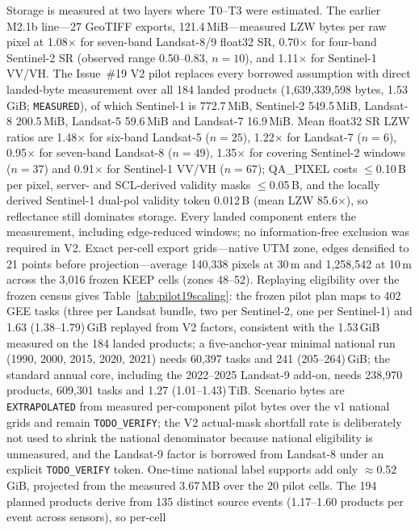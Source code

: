 Storage is measured at two layers where T0--T3 were estimated. The
earlier M2.1b line---27 GeoTIFF exports, 121.4\,MiB---measured LZW
bytes per raw pixel at 1.08$\times$ for seven-band Landsat-8/9 float32
SR, 0.70$\times$ for four-band Sentinel-2 SR (observed range
0.50--0.83, $n=10$), and 1.11$\times$ for Sentinel-1 VV/VH. The
Issue~\#19 V2 pilot replaces every borrowed assumption with direct
landed-byte measurement over all 184 landed products
(1{,}639{,}339{,}598 bytes, 1.53\,GiB; \texttt{MEASURED}), of which
Sentinel-1 is 772.7\,MiB, Sentinel-2 549.5\,MiB, Landsat-8 200.5\,MiB,
Landsat-5 59.6\,MiB and Landsat-7 16.9\,MiB. Mean float32 SR LZW
ratios are 1.48$\times$ for six-band Landsat-5 ($n=25$),
1.22$\times$ for Landsat-7 ($n=6$), 0.95$\times$ for seven-band
Landsat-8 ($n=49$), 1.35$\times$ for covering Sentinel-2 windows
($n=37$) and 0.91$\times$ for Sentinel-1 VV/VH ($n=67$); QA\_PIXEL
costs $\le$0.10\,B per pixel, server- and SCL-derived validity masks
$\le$0.05\,B, and the locally derived Sentinel-1 dual-pol validity
token 0.012\,B (mean LZW 85.6$\times$), so reflectance still dominates
storage. Every landed component enters the measurement, including
edge-reduced windows; no information-free exclusion was required in
V2. Exact per-cell export grids---native UTM zone, edges densified to
21 points before projection---average 140{,}338 pixels at 30\,m and
1{,}258{,}542 at 10\,m across the 3{,}016 frozen KEEP cells (zones
48--52). Replaying eligibility over the frozen census gives
Table~\ref{tab:pilot19scaling}: the frozen pilot plan maps to 402 GEE
tasks (three per Landsat bundle, two per Sentinel-2, one per
Sentinel-1) and 1.63 (1.38--1.79)\,GiB replayed from V2 factors,
consistent with the 1.53\,GiB measured on the 184 landed products; a
five-anchor-year minimal national run (1990, 2000, 2015, 2020, 2021)
needs 60{,}397 tasks and 241 (205--264)\,GiB; the standard annual core,
including the 2022--2025 Landsat-9 add-on, needs 238{,}970 products,
609{,}301 tasks and 1.27 (1.01--1.43)\,TiB. Scenario bytes are
\texttt{EXTRAPOLATED} from measured per-component pilot bytes over the
v1 national grids and remain \texttt{TODO\_VERIFY}; the V2 actual-mask
shortfall rate is deliberately not used to shrink the national
denominator because national eligibility is unmeasured, and the
Landsat-9 factor is borrowed from Landsat-8 under an explicit
\texttt{TODO\_VERIFY} token. One-time national label supports add only
$\approx$0.52\,GiB, projected from the measured 3.67\,MB over the 20
pilot cells. The 194 planned products derive from 135 distinct source
events (1.17--1.60 products per event across sensors), so per-cell
